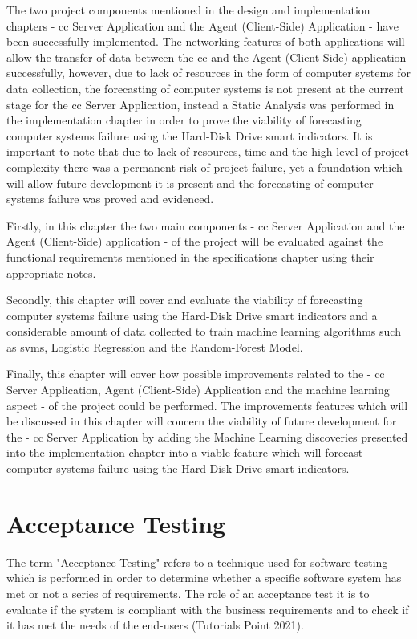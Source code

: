 The two project components mentioned in the design and implementation chapters
- \acrfull{cc} Server Application and the Agent (Client-Side) Application - have been
successfully implemented. The networking features of both applications will allow the transfer of data between the \acrfull{cc}
and the Agent (Client-Side) application successfully, however, due to lack of resources in the form of computer systems
for data collection, the forecasting of computer systems is not present at the current stage for the \acrfull{cc}
Server Application, instead a Static Analysis was performed in the implementation chapter
in order to prove the viability of forecasting computer systems failure using the Hard-Disk Drive \acrfull{smart}
indicators.
It is important to note that due to lack of resources, time and the high level of project complexity
there was a permanent risk of project failure, yet a foundation which will allow
future development it is present and the forecasting of computer systems failure was proved and evidenced. \par
Firstly, in this chapter the two main components - \acrfull{cc} Server Application and
the Agent (Client-Side) application - of the project will be evaluated
against the functional requirements mentioned in the specifications chapter using their appropriate notes. \par
Secondly, this chapter will cover and evaluate the viability of forecasting computer systems failure
using the Hard-Disk Drive \acrfull{smart} indicators and a considerable amount of data collected to
train machine learning algorithms such as \acrfull{svms}, Logistic Regression and the Random-Forest Model. \par
Finally, this chapter will cover how possible improvements related to the - \acrfull{cc} Server Application,
Agent (Client-Side) Application and the machine learning aspect - of the project could be performed. The improvements
features which will be discussed in this chapter will concern the viability of future development for the - \acrfull{cc}
Server Application by adding the Machine Learning discoveries presented into the implementation chapter
into a viable feature which will forecast computer systems failure using the Hard-Disk Drive \acrfull{smart}
indicators.

\section{Acceptance Testing}

The term "Acceptance Testing" refers to a technique used for software testing which
is performed in order to determine whether a specific software system has met or not a series of
requirements. The role of an acceptance test it is to evaluate if the system is compliant with
the business requirements and to check if it has met the needs of the end-users (Tutorials Point 2021).

